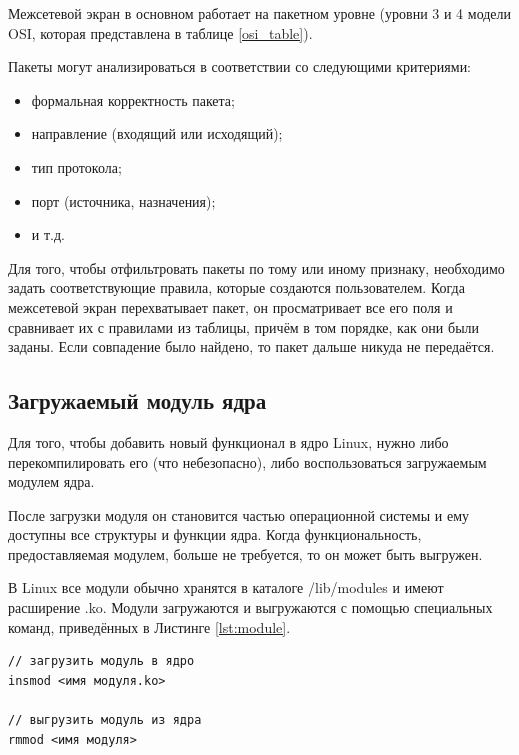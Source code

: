 Межсетевой экран в основном работает на пакетном уровне (уровни 3 и 4 модели OSI, которая представлена в таблице \ref{osi_table}). \cite{fw}

Пакеты могут анализироваться в соответствии со следующими критериями: 
\begin{itemize}
	\item формальная корректность пакета;
	\item направление (входящий или исходящий);
	\item тип протокола;
	\item порт (источника, назначения);
	\item и т.д. \\
\end{itemize}

Для того, чтобы отфильтровать пакеты по тому или иному признаку, необходимо задать соответствующие правила, которые создаются пользователем. Когда межсетевой экран перехватывает пакет, он просматривает все его поля и сравнивает их с правилами из таблицы, причём в том порядке, как они были заданы. Если совпадение было найдено, то пакет дальше никуда не передаётся. \newline

\subsection{Загружаемый модуль ядра}
Для того, чтобы добавить новый функционал в ядро Linux, нужно либо перекомпилировать его (что небезопасно), либо воспользоваться загружаемым модулем ядра. \cite{os}

После загрузки модуля он становится частью операционной системы и ему доступны все структуры и функции ядра. Когда функциональность, предоставляемая модулем, больше не требуется, то он может быть выгружен.

В Linux все модули обычно хранятся в каталоге /lib/modules и имеют расширение .ko. Модули загружаются и выгружаются с помощью специальных команд, приведённых в Листинге \ref{lst:module}.

\begin{lstlisting}[caption = {Команды для загрузки и выгрузки загружаемого модуля ядра}, label=lst:module]
// загрузить модуль в ядро
insmod <имя модуля.ko>
		
// выгрузить модуль из ядра
rmmod <имя модуля>
\end{lstlisting}

